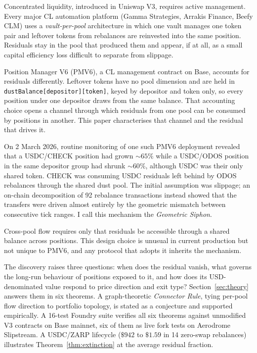 \documentclass{manuscript}
\begin{document}
Concentrated liquidity, introduced in Uniswap V3,\cite{adams2021} requires active management. Every major CL automation platform (Gamma Strategies, Arrakis Finance, Beefy CLM) uses a \emph{vault-per-pool} architecture in which one vault manages one token pair and leftover tokens from rebalances are reinvested into the same position. Residuals stay in the pool that produced them and appear, if at all, as a small capital efficiency loss difficult to separate from slippage.

Position Manager V6 (PMV6), a CL management contract on Base, accounts for residuals differently. Leftover tokens have no pool dimension and are held in \texttt{dustBalance[depositor]}\allowbreak\texttt{[token]}, keyed by depositor and token only, so every position under one depositor draws from the same balance. That accounting choice opens a channel through which residuals from one pool can be consumed by positions in another. This paper characterises that channel and the residual that drives it.

On 2 March 2026, routine monitoring of one such PMV6 deployment revealed that a USDC/CHECK position had grown ${\sim}65\%$ while a USDC/ODOS position in the same depositor group had shrunk ${\sim}60\%$, although USDC was their only shared token. CHECK was consuming USDC residuals left behind by ODOS rebalances through the shared dust pool. The initial assumption was slippage; an on-chain decomposition of 92 rebalance transactions instead showed that the transfers were driven almost entirely by the geometric mismatch between consecutive tick ranges. I call this mechanism the \emph{Geometric Siphon}.

Cross-pool flow requires only that residuals be accessible through a shared balance across positions. This design choice is unusual in current production but not unique to PMV6, and any protocol that adopts it inherits the mechanism.

The discovery raises three questions: when does the residual vanish, what governs the long-run behaviour of positions exposed to it, and how does its USD-denominated value respond to price direction and exit type? Section~\ref{sec:theory} answers them in six theorems. A graph-theoretic \emph{Connector Rule}, tying per-pool flow direction to portfolio topology, is stated as a conjecture and supported empirically. A 16-test Foundry suite verifies all six theorems against unmodified V3 contracts on Base mainnet, six of them as live fork tests on Aerodrome Slipstream. A USDC/ZARP lifecycle ($\$942$ to $\$1.59$ in 14 zero-swap rebalances) illustrates Theorem~\ref{thm:extinction} at the average residual fraction.
\end{document}
